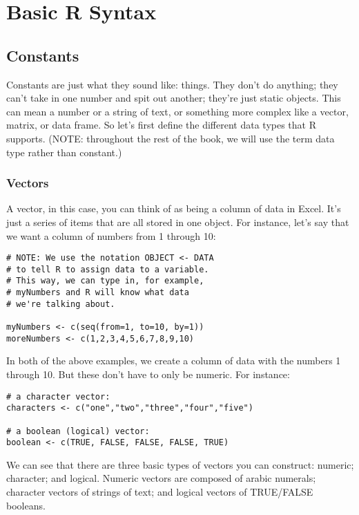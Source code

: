 \section{Basic R Syntax}

\subsection{Constants}
Constants are just what they sound like: things. They don't do anything; they can't take in one number and spit out another; they're just static objects. This can mean a number or a string of text, or something more complex like a vector, matrix, or data frame. So let's first define the different data types that R supports. (NOTE: throughout the rest of the book, we will use the term data type rather than constant.)

\subsubsection{Vectors}
A vector, in this case, you can think of as being a column of data in Excel. It's just a series of items that are all stored in one object. For instance, let's say that we want a column of numbers from 1 through 10:

\begin{framed}
\begin{Verbatim}[samepage=TRUE]
# NOTE: We use the notation OBJECT <- DATA
# to tell R to assign data to a variable.
# This way, we can type in, for example,
# myNumbers and R will know what data
# we're talking about.

myNumbers <- c(seq(from=1, to=10, by=1))
moreNumbers <- c(1,2,3,4,5,6,7,8,9,10)
\end{Verbatim}
\end{framed}

In both of the above examples, we create a column of data with the numbers 1 through 10. But these don't have to only be numeric. For instance:

\begin{framed}
\begin{Verbatim}[samepage=TRUE]
# a character vector:
characters <- c("one","two","three","four","five")

# a boolean (logical) vector:
boolean <- c(TRUE, FALSE, FALSE, FALSE, TRUE)
\end{Verbatim}
\end{framed}

We can see that there are three basic types of vectors you can construct: numeric; character; and logical. Numeric vectors are composed of arabic numerals; character vectors of strings of text; and logical vectors of TRUE/FALSE booleans.

